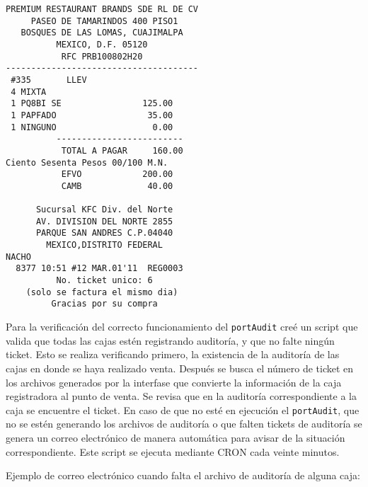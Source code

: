 \begin{Verbatim}[fontsize=\small]
 PREMIUM RESTAURANT BRANDS SDE RL DE CV  
     PASEO DE TAMARINDOS 400 PISO1       
   BOSQUES DE LAS LOMAS, CUAJIMALPA      
          MEXICO, D.F. 05120             
           RFC PRB100802H20              
--------------------------------------   
 #335       LLEV  
 4 MIXTA   
 1 PQ8BI SE                125.00  
 1 PAPFADO                  35.00  
 1 NINGUNO                   0.00  
          -------------------------  
           TOTAL A PAGAR     160.00  
Ciento Sesenta Pesos 00/100 M.N.  
           EFVO            200.00  
           CAMB             40.00  
                                         
      Sucursal KFC Div. del Norte        
      AV. DIVISION DEL NORTE 2855        
      PARQUE SAN ANDRES C.P.04040        
        MEXICO,DISTRITO FEDERAL          
NACHO  
  8377 10:51 #12 MAR.01'11  REG0003  
          No. ticket unico: 6     
    (solo se factura el mismo dia)       
         Gracias por su compra           
\end{Verbatim}

Para la verificación del correcto funcionamiento del \texttt{portAudit} creé un script que valida que todas las cajas estén registrando auditoría, y que no falte ningún ticket. Esto se realiza verificando primero, la existencia de la auditoría de las cajas en donde se haya realizado venta. Después se busca el número de ticket en los archivos generados por la interfase que convierte la información de la caja registradora al punto de venta. Se revisa que en la auditoría correspondiente a la caja se encuentre el ticket. En caso de que no esté en ejecución el \texttt{portAudit}, que no se estén generando los archivos de auditoría o que falten tickets de auditoría se genera un correo electrónico de manera automática para avisar de la situación correspondiente. Este script se ejecuta mediante CRON cada veinte minutos.

Ejemplo de correo electrónico cuando falta el archivo de auditoría de alguna caja:

